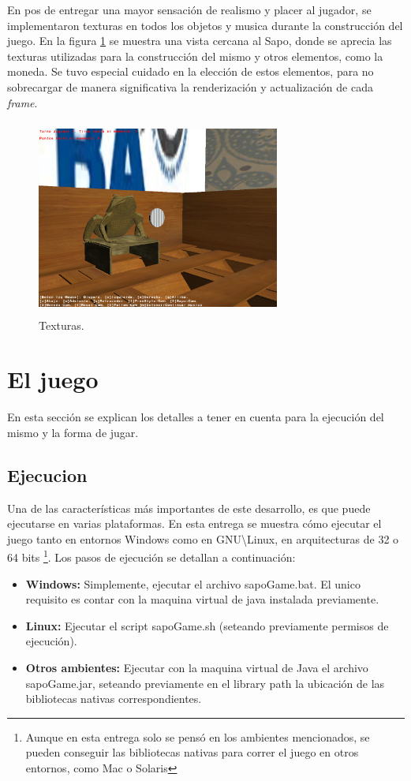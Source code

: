 \documentclass{acm_proc_article-sp}
\begin{document}
En pos de entregar una mayor sensaci\'on de realismo y placer al jugador, se implementaron texturas en todos los objetos y musica durante la construcci\'on del juego. En la figura \ref{fig:texturas} se muestra una vista cercana al Sapo, donde se aprecia las texturas utilizadas para la construcci\'on del mismo y otros elementos, como la moneda. Se tuvo especial cuidado en la elecci\'on de estos elementos, para no sobrecargar de manera significativa la renderizaci\'on y actualizaci\'on de cada \textit{frame}. 

\begin{figure}[!ht]
	\centering
		\includegraphics[width=8cm,height=6.45cm]{img/littleSapoShoot.png}
	\caption{Texturas.}
	\label{fig:texturas}
\end{figure}

\section{El juego}
\label{sec:juego}

En esta secci\'on se explican los detalles a tener en cuenta para la ejecuci\'on del mismo y la forma de jugar.
\subsection{Ejecucion}
Una de las caracter\'isticas m\'as importantes de este desarrollo, es que puede ejecutarse en varias plataformas. En esta entrega se muestra c\'omo ejecutar el juego tanto en entornos Windows como en GNU\textbackslash Linux, en arquitecturas de 32 o 64 bits \footnote{Aunque en esta entrega solo se pens\'o en los ambientes mencionados, se pueden conseguir las bibliotecas nativas para correr el juego en otros entornos, como Mac o Solaris}.
Los pasos de ejecuci\'on se detallan a continuaci\'on:

\begin{itemize}
 \item \textbf{Windows:} Simplemente, ejecutar el archivo sapoGame.bat. El unico requisito es contar con la maquina virtual de java instalada previamente.
\item \textbf{Linux:} Ejecutar el script sapoGame.sh (seteando previamente permisos de ejecuci\'on).
\item \textbf{Otros ambientes:} Ejecutar con la maquina virtual de Java el archivo sapoGame.jar, seteando previamente en el library path la ubicaci\'on de las bibliotecas nativas correspondientes.
\end{itemize}
 
\end{document}
